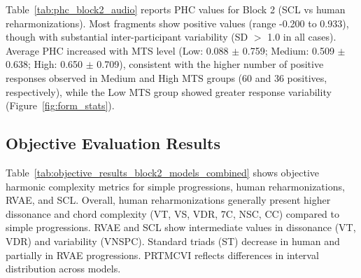 \documentclass[conference]{IEEEtran}
\begin{document}
Table~\ref{tab:phc_block2_audio} reports PHC values for Block 2 (SCL vs human reharmonizations). Most fragments show positive values (range -0.200 to 0.933), though with substantial inter-participant variability (SD $>$ 1.0 in all cases). Average PHC increased with MTS level (Low: 0.088 $\pm$ 0.759; Medium: 0.509 $\pm$ 0.638; High: 0.650 $\pm$ 0.709), consistent with the higher number of positive responses observed in Medium and High MTS groups (60 and 36 positives, respectively), while the Low MTS group showed greater response variability (Figure~\ref{fig:form_stats}).
\begin{table}[t]
\centering
\caption{PHC values per audio fragment in Block 2 with corresponding SCL-generated chord progressions.}
\label{tab:phc_block2_audio}
\end{table}
\subsection{Objective Evaluation Results}
Table~\ref{tab:objective_results_block2_models_combined} shows objective harmonic complexity metrics for simple progressions, human reharmonizations, RVAE, and SCL. Overall, human reharmonizations generally present higher dissonance and chord complexity (VT, VS, VDR, 7C, NSC, CC) compared to simple progressions. RVAE and SCL show intermediate values in dissonance (VT, VDR) and variability (VNSPC). Standard triads (ST) decrease in human and partially in RVAE progressions. PRTMCVI reflects differences in interval distribution across models.
\end{document}
